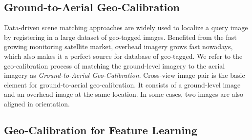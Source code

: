 \subsection{Ground-to-Aerial Geo-Calibration}
Data-driven scene matching approaches are widely used to localize a
query image by registering in a large dataset of geo-tagged images. 
Benefited from the fast growing monitoring satellite market, overhead
imagery grows fast nowadays, which also makes it a perfect source for
database of geo-tagged. We refer to the geo-calibration process of
matching the ground-level imagery to the aerial imagery as {\em
Ground-to-Aerial Geo-Calibration}.
%
Cross-view image pair is the basic element for ground-to-aerial
geo-calibration. It consists of a ground-level image and an overhead
image at the same location. In some cases, two images are also aligned
in orientation. 



\subsection{Geo-Calibration for Feature Learning}

